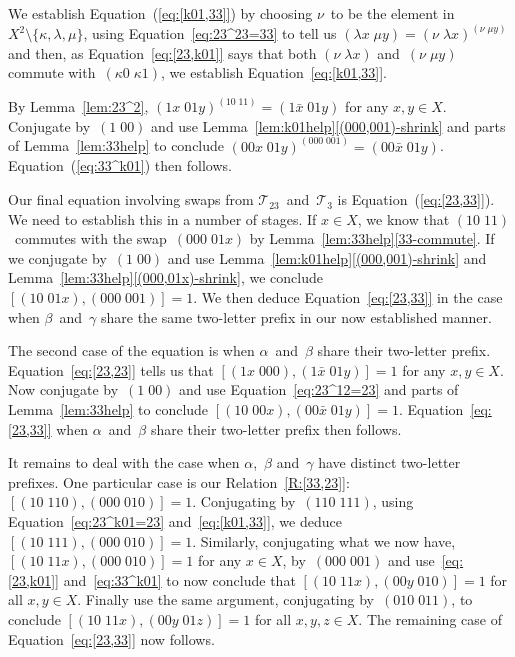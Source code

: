 \documentclass[a4paper,11pt]{article}
\numberwithin{equation}{section}
\newcommand{\eqstate}[1]{Equation~(\ref{#1})}
\newcommand{\swap}[2]{(#1\;#2)}
\newcommand{\Sw}[1]{\mathcal{T}_{#1}}
\begin{document}
We establish \eqstate{eq:[k01,33]} by choosing $\nu$~to be the element
in~$X^{2} \setminus \{\kappa,\lambda,\mu\}$, using
Equation~\eqref{eq:23^23=33} to tell us $\swap{\lambda x}{\mu y} =
\swap{\nu}{\lambda x}^{\swap{\nu}{\mu y}}$ and then, as
Equation~\eqref{eq:[23,k01]} says that both $\swap{\nu}{\lambda x}$
and~$\swap{\nu}{\mu y}$ commute with~$\swap{\kappa0}{\kappa1}$, we
establish Equation~\eqref{eq:[k01,33]}.

By Lemma~\ref{lem:23^2}, $\swap{1x}{01y}^{\swap{10}{11}} =
\swap{1\bar{x}}{01y}$ for any $x,y \in X$.  Conjugate
by~$\swap{1}{00}$ and use
Lemma~\ref{lem:k01help}\ref{(000,001)-shrink} and parts of
Lemma~\ref{lem:33help} to conclude $\swap{00x}{01y}^{\swap{000}{001}}
= \swap{00\bar{x}}{01y}$.  \eqstate{eq:33^k01} then follows.

Our final equation involving swaps from $\Sw{23}$~and~$\Sw{3}$ is
\eqstate{eq:[23,33]}.  We need to establish this in a number of
stages.  If $x \in X$, we know that $\swap{10}{11}$~commutes with the
swap~$\swap{000}{01x}$ by Lemma~\ref{lem:33help}\ref{33-commute}.  If
we conjugate by~$\swap{1}{00}$ and use
Lemma~\ref{lem:k01help}\ref{(000,001)-shrink} and
Lemma~\ref{lem:33help}\ref{(000,01x)-shrink}, we conclude $[
  \swap{10}{01x}, \swap{000}{001} ] = 1$.  We then deduce
Equation~\eqref{eq:[23,33]} in the case when $\beta$~and~$\gamma$
share the same two-letter prefix in our now established manner.

The second case of the equation is when $\alpha$~and~$\beta$ share
their two-letter prefix.  Equation~\eqref{eq:[23,23]} tells us that $[
  \swap{1x}{000} , \swap{1\bar{x}}{01y} ] = 1$ for any $x,y \in X$.
Now conjugate by~$\swap{1}{00}$ and use Equation~\eqref{eq:23^12=23}
and parts of Lemma~\ref{lem:33help} to conclude $[ \swap{10}{00x} ,
  \swap{00\bar{x}}{01y} ] = 1$.  Equation~\eqref{eq:[23,33]} when
$\alpha$~and~$\beta$ share their two-letter prefix then follows.

It remains to deal with the case when $\alpha$,~$\beta$ and~$\gamma$
have distinct two-letter prefixes.  One particular case is our
Relation~\ref{R:[33,23]}: $[\swap{10}{110} , \swap{000}{010} ] = 1$.
Conjugating by~$\swap{110}{111}$, using Equation~\eqref{eq:23^k01=23}
and~\eqref{eq:[k01,33]}, we deduce $[\swap{10}{111} , \swap{000}{010}
] = 1$.  Similarly, conjugating what we now have, $[ \swap{10}{11x} ,
\swap{000}{010} ] = 1$ for any $x \in X$, by~$\swap{000}{001}$ and
use~\eqref{eq:[23,k01]} and~\eqref{eq:33^k01} to now conclude that
$[ \swap{10}{11x} , \swap{00y}{010}] = 1$ for all $x,y \in X$.
Finally use the same argument, conjugating by~$\swap{010}{011}$, to
conclude $[ \swap{10}{11x} , \swap{00y}{01z} ] = 1$ for all $x,y,z \in
X$.  The remaining case of Equation~\eqref{eq:[23,33]} now follows.
\end{document}
